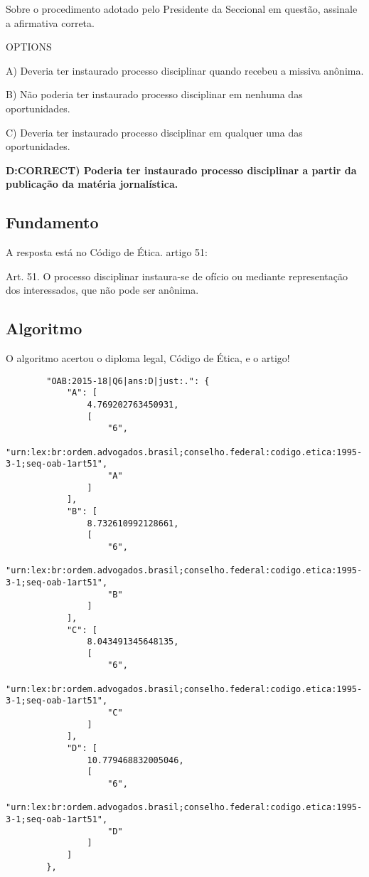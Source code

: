\documentclass[12pt]{article}
\begin{document}
Sobre o procedimento adotado pelo Presidente da Seccional 
em questão, assinale a afirmativa correta. 

OPTIONS

A) Deveria ter instaurado processo disciplinar quando 
recebeu a missiva anônima. 

B) Não poderia ter instaurado processo disciplinar em 
nenhuma das oportunidades. 

C) Deveria ter instaurado processo disciplinar em qualquer 
uma das oportunidades. 

\textbf{D:CORRECT) Poderia ter instaurado processo disciplinar a partir da publicação da matéria jornalística.}

\subsection{Fundamento}

A resposta está no Código de Ética. artigo 51:

Art. 51. O processo disciplinar instaura-se de ofício ou mediante representação dos interessados, que não pode ser anônima.

\subsection{Algoritmo}

O algoritmo acertou o diploma legal, Código de Ética, e o artigo!

\begin{lstlisting}
        "OAB:2015-18|Q6|ans:D|just:.": {
            "A": [
                4.769202763450931,
                [
                    "6",
                    "urn:lex:br:ordem.advogados.brasil;conselho.federal:codigo.etica:1995-3-1;seq-oab-1art51",
                    "A"
                ]
            ],
            "B": [
                8.732610992128661,
                [
                    "6",
                    "urn:lex:br:ordem.advogados.brasil;conselho.federal:codigo.etica:1995-3-1;seq-oab-1art51",
                    "B"
                ]
            ],
            "C": [
                8.043491345648135,
                [
                    "6",
                    "urn:lex:br:ordem.advogados.brasil;conselho.federal:codigo.etica:1995-3-1;seq-oab-1art51",
                    "C"
                ]
            ],
            "D": [
                10.779468832005046,
                [
                    "6",
                    "urn:lex:br:ordem.advogados.brasil;conselho.federal:codigo.etica:1995-3-1;seq-oab-1art51",
                    "D"
                ]
            ]
        },
        
\end{lstlisting}
\end{document}
